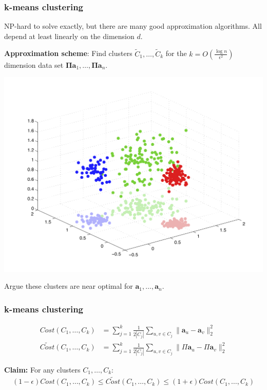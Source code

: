\documentclass[compress]{beamer}
\newcommand{\bs}[1]{\boldsymbol{#1}}
\newcommand{\bv}[1]{\mathbf{#1}}
\begin{document}
\begin{frame}[t]
	\frametitle{k-means clustering}
	NP-hard to solve exactly, but there are many good approximation algorithms. All depend at least linearly on the dimension $d$. 
	
	\textbf{Approximation scheme}: Find clusters $\tilde{C}_1, \ldots, \tilde{C}_k$ for the $k = O\left(\frac{\log n}{\epsilon^2}\right)$ dimension data set $\bs{\Pi}\bv{a}_1, \ldots, \bs{\Pi}\bv{a}_n.$
	
	\vspace{-3em}
	\begin{center}
		\includegraphics[width=.6\textwidth]{clustering_projected.png}
	\end{center}
	\vspace{-2em}
	Argue these clusters are near optimal for $\bv{a}_1, \ldots, \bv{a}_n$.
\end{frame}




\begin{frame}[t]
	\frametitle{k-means clustering}
	\begin{align*}
		Cost(C_1,\ldots, C_k) &= \sum_{j=1}^k \frac{1}{2|C_j|}\sum_{u,v\in C_j} \|\bv{a}_u - \bv{a}_v\|_2^2 \\
		\widetilde{Cost}(C_1,\ldots, C_k) &= \sum_{j=1}^k \frac{1}{2|C_j|}\sum_{u,v\in C_j} \|\Pi\bv{a}_u - \Pi\bv{a}_v\|_2^2
	\end{align*}
		
		
		\textbf{Claim:} For any clusters $C_1, \ldots, C_k$:
		\begin{align*}
	(1-\epsilon) Cost(C_1, \ldots, C_k) \leq \widetilde{Cost}(C_1, \ldots, C_k)   \leq  (1+\epsilon) Cost(C_1, \ldots, C_k) 
		\end{align*}
	
\end{frame}
\end{document}
